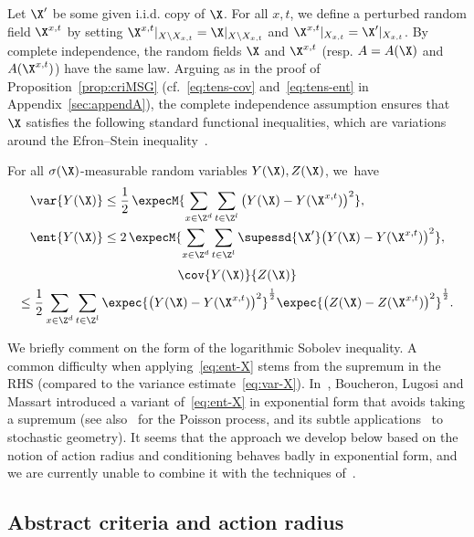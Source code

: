 
Let $\X'$ be some given i.i.d. copy of $\X$. For all $x,t$, we define a perturbed random field $\X^{x,t}$ by setting $\X^{x,t}|_{X\setminus X_{x,t}}=\X|_{X\setminus X_{x,t}}$ and $\X^{x,t}|_{X_{x,t}}=\X'|_{X_{x,t}}$. By complete independence, the random fields $\X$ and $\X^{x,t}$ (resp. $A=A(\X)$ and $A(\X^{x,t})$) have the same law. Arguing as in the proof of Proposition~\ref{prop:criMSG} (cf.~\eqref{eq:tens-cov} and~\eqref{eq:tens-ent} in Appendix~\ref{sec:appendA}), the complete independence assumption ensures that $\X$ satisfies the following standard functional inequalities, which are variations around the Efron--Stein inequality~\cite{Efron-Stein-81,Steele-86}.

\begin{prop}\label{prop:sgindep}
For all $\sigma(\X)$-measurable random variables $Y(\X),Z(\X)$, we~have
\begin{align}
\var{Y(\X)}&\le\frac12\,\expecM{\sum_{x\in\Z^d}\sum_{t\in\Z^l}\big(Y(\X)-Y(\X^{x,t})\big)^2},\label{eq:var-X}
\\
\ent{Y(\X)}&\le 2\,\expecM{\sum_{x\in\Z^d}\sum_{t\in\Z^l}\supessd{\X'}\big(Y(\X)-Y(\X^{x,t})\big)^2},\label{eq:ent-X}
\end{align}
\begin{multline}\label{eq:cov-X}
\cov{Y(\X)}{Z(\X)}\\
\le \frac12\sum_{x\in\Z^d}\sum_{t\in\Z^l}\expec{ \big(Y(\X)-Y(\X^{x,t})\big)^2}^\frac12\expec{ \big(Z(\X)-Z(\X^{x,t})\big)^2}^\frac12.
\end{multline}
\qedhere
\end{prop}

We briefly comment on the form of the logarithmic Sobolev inequality. A common difficulty when applying~\eqref{eq:ent-X} stems from the supremum in the RHS (compared to the variance estimate~\eqref{eq:var-X}). In~\cite{BLM-03}, Boucheron, Lugosi and Massart introduced a variant of~\eqref{eq:ent-X} in exponential form that avoids taking a supremum (see also~\cite{Wu00} for the Poisson process, and its subtle applications~\cite{BachPec} to stochastic geometry). It seems that the approach we develop below based on the notion of action radius and conditioning behaves badly in exponential form, and we are currently unable to combine it with the techniques of~\cite{BLM-03}.



\subsection{Abstract criteria and action radius}\label{chap:condunif-pasunif}

